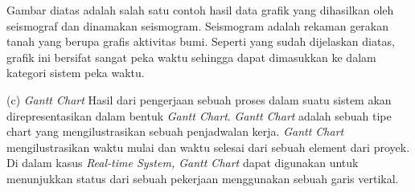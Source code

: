 \documentclass[a4paper,twoside]{article}
\begin{document}
\begin{enumerate}
		Gambar diatas adalah salah satu contoh hasil data grafik yang dihasilkan oleh seismograf dan dinamakan seismogram. Seismogram adalah rekaman gerakan tanah yang berupa grafis aktivitas bumi. Seperti yang sudah dijelaskan diatas, grafik ini bersifat sangat peka waktu sehingga dapat dimasukkan ke dalam kategori sistem peka waktu.
		
		(c) {\it Gantt Chart}\newline
		Hasil dari pengerjaan sebuah proses dalam suatu sistem akan direpresentasikan dalam bentuk {\it Gantt Chart}. {\it Gantt Chart} adalah sebuah tipe chart yang mengilustrasikan sebuah penjadwalan kerja. {\it Gantt Chart} mengilustrasikan waktu mulai dan waktu selesai dari sebuah element dari proyek. Di dalam kasus {\it Real-time System, Gantt Chart} dapat digunakan untuk menunjukkan status dari sebuah pekerjaan menggunakan sebuah garis vertikal.
		
		\newpage
		

\end{enumerate}
\end{document}

